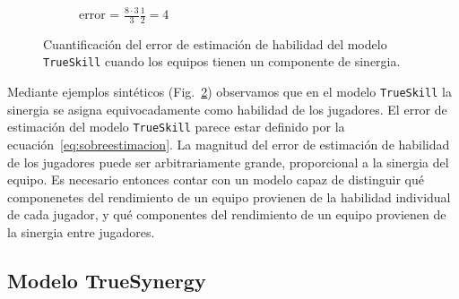 \documentclass[a4paper,11pt]{book}
\theoremstyle{definition}
\begin{document}
\begin{figure}[H]
\begin{subfigure}[t]{0.32\textwidth}
  \caption{\scriptsize error = $\frac{8\cdot3}{3}\frac{1}{2} = 4$}\label{F8}
  \end{subfigure}
  \caption{Cuantificaci\'on del error de estimaci\'on de habilidad del modelo \texttt{TrueSkill} cuando los equipos tienen un componente de sinergia.}
  \label{fig:sobreestimacion}
\end{figure}

Mediante ejemplos sint\'eticos (Fig.~\ref{fig:sobreestimacion}) observamos que en el modelo \texttt{TrueSkill} la sinergia se asigna equivocadamente como habilidad de los jugadores.
El error de estimaci\'on del modelo \texttt{TrueSkill} parece estar definido por la ecuaci\'on~\ref{eq:sobreestimacion}.
La magnitud del error de estimaci\'on de habilidad de los jugadores puede ser arbitrariamente grande, proporcional a la sinergia del equipo.
Es necesario entonces contar con un modelo capaz de distinguir qu\'e componenetes del rendimiento de un equipo provienen de la habilidad individual de cada jugador, y qu\'e componentes del rendimiento de un equipo provienen de la sinergia entre jugadores.

\subsection{Modelo TrueSynergy}
\end{document}
